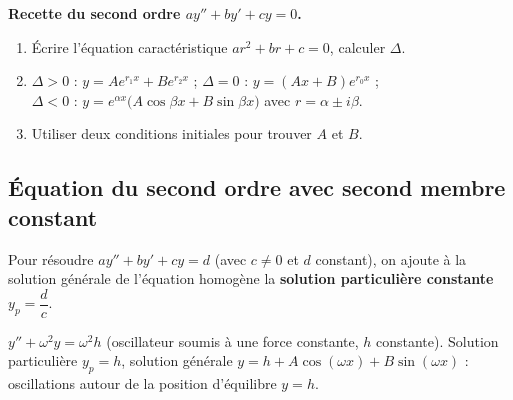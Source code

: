 \begin{illus}
\end{illus}

\begin{aretenir}
\textbf{Recette du second ordre $ay''+by'+cy=0$.}
\begin{enumerate}[label=\arabic*)]
\item Écrire l'équation caractéristique $ar^2+br+c=0$, calculer $\Delta$.
\item $\Delta>0$ : $y=Ae^{r_1x}+Be^{r_2x}$ ;\quad
$\Delta=0$ : $y=(Ax+B)e^{r_0x}$ ;\\
$\Delta<0$ : $y=e^{\alpha x}\big(A\cos\beta x+B\sin\beta x\big)$ avec
$r=\alpha\pm i\beta$.
\item Utiliser deux conditions initiales pour trouver $A$ et $B$.
\end{enumerate}
\end{aretenir}

\subsection{Équation du second ordre avec second membre constant}

\begin{propriete}
Pour résoudre $ay''+by'+cy=d$ (avec $c\neq0$ et $d$ constant), on ajoute à la
solution générale de l'équation homogène la \textbf{solution particulière
constante} $y_p=\dfrac{d}{c}$.
\end{propriete}

\begin{exemple}
$y''+\omega^2 y=\omega^2 h$ (oscillateur soumis à une force constante, $h$
constante). Solution particulière $y_p=h$, solution générale
$y=h+A\cos(\omega x)+B\sin(\omega x)$ : oscillations autour de la position
d'équilibre $y=h$.
\end{exemple}

